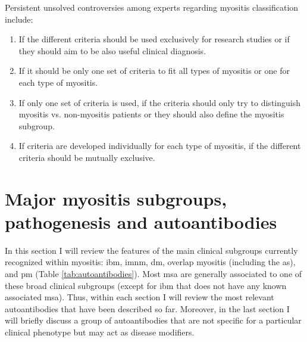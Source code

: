 Persistent unsolved controversies among experts regarding myositis classification include:
 
\begin{enumerate}
	\item If the different criteria should be used exclusively for research studies or if they should aim to be also useful clinical diagnosis.
	
	\item If it should be only one set of criteria to fit all types of myositis or one for each type of myositis.
	
	\item If only one set of criteria is used, if the criteria should only try to distinguish myositis vs. non-myositis patients or they should also define the myositis subgroup.
	
	\item If criteria are developed individually for each type of myositis, if the different criteria should be mutually exclusive. 
\end{enumerate}

\section{Major myositis subgroups, pathogenesis and autoantibodies}

In this section I will review the features of the main clinical subgroups currently recognized within myositis: \gls{ibm}, \gls{imnm}, \gls{dm}, overlap myositis (including the \gls{as}), and \gls{pm} (Table \ref{tab:autoantibodies}). Most \gls{msa} are generally associated to one of these broad clinical subgroups (except for \gls{ibm} that does not have any known associated \gls{msa}). Thus, within each section I will review the most relevant autoantibodies that have been described so far. Moreover, in the last section I will briefly discuss a group of autoantibodies that are not specific for a particular clinical phenotype but may act as disease modifiers.

